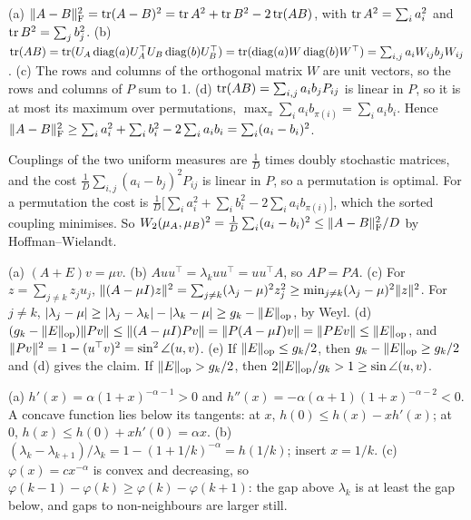 (a) $\lVert A-B\rVert_{\mathrm{F}}^2=\operatorname{tr}(A-B)^2=\operatorname{tr} A^2+\operatorname{tr} B^2-2\operatorname{tr}(AB)$, with $\operatorname{tr} A^2=\sum_ia_i^2$ and $\operatorname{tr} B^2=\sum_jb_j^2$.
\newline (b) $\operatorname{tr}(AB)=\operatorname{tr}(U_A\operatorname{diag}(a)U_A^\top U_B\operatorname{diag}(b)U_B^\top)=\operatorname{tr}(\operatorname{diag}(a)W\operatorname{diag}(b)W^\top)=\sum_{i,j}a_iW_{ij}b_jW_{ij}$.
\newline (c) The rows and columns of the orthogonal matrix $W$ are unit vectors, so the rows and columns of $P$ sum to 1.
\newline (d) $\operatorname{tr}(AB)=\sum_{i,j}a_ib_jP_{ij}$ is linear in $P$, so it is at most its maximum over permutations,
$\max_\pi\sum_ia_ib_{\pi(i)}=\sum_ia_ib_i$. Hence $\lVert A-B\rVert_{\mathrm{F}}^2\ge\sum_ia_i^2+\sum_ib_i^2-2\sum_ia_ib_i=\sum_i(a_i-b_i)^2$.

Couplings of the two uniform measures are $\frac1D$ times doubly stochastic matrices, and the cost
$\frac1D\sum_{i,j}(a_i-b_j)^2P_{ij}$ is linear in $P$, so a permutation is optimal. For a permutation the cost is
$\frac1D\bigl[\sum_ia_i^2+\sum_ib_i^2-2\sum_ia_ib_{\pi(i)}\bigr]$, which the sorted coupling minimises. So
$W_2(\mu_A,\mu_B)^2=\frac1D\sum_i(a_i-b_i)^2\le\lVert A-B\rVert_{\mathrm{F}}^2/D$ by Hoffman--Wielandt.

(a) $(A+E)v=\mu v$.
\newline (b) $Auu^\top=\lambda_kuu^\top=uu^\top A$, so $AP=PA$.
\newline (c) For $z=\sum_{j\ne k}z_ju_j$, $\lVert(A-\mu I)z\rVert^2=\sum_{j\ne k}(\lambda_j-\mu)^2z_j^2\ge\min_{j\ne k}(\lambda_j-\mu)^2\lVert z\rVert^2$.
For $j\ne k$, $\lvert\lambda_j-\mu\rvert\ge\lvert\lambda_j-\lambda_k\rvert-\lvert\lambda_k-\mu\rvert\ge g_k-\lVert E\rVert_{\mathrm{op}}$, by Weyl.
\newline (d) $(g_k-\lVert E\rVert_{\mathrm{op}})\lVert Pv\rVert\le\lVert(A-\mu I)Pv\rVert=\lVert P(A-\mu I)v\rVert=\lVert PEv\rVert\le\lVert E\rVert_{\mathrm{op}}$, and
$\lVert Pv\rVert^2=1-(u^\top v)^2=\sin^2\angle(u,v)$.
\newline (e) If $\lVert E\rVert_{\mathrm{op}}\le g_k/2$, then $g_k-\lVert E\rVert_{\mathrm{op}}\ge g_k/2$ and (d) gives the claim. If $\lVert E\rVert_{\mathrm{op}}>g_k/2$, then
$2\lVert E\rVert_{\mathrm{op}}/g_k>1\ge\sin\angle(u,v)$.

(a) $h'(x)=\alpha(1+x)^{-\alpha-1}>0$ and $h''(x)=-\alpha(\alpha+1)(1+x)^{-\alpha-2}<0$. A concave function lies below
its tangents: at $x$, $h(0)\le h(x)-xh'(x)$; at 0, $h(x)\le h(0)+xh'(0)=\alpha x$.
\newline (b) $(\lambda_k-\lambda_{k+1})/\lambda_k=1-(1+1/k)^{-\alpha}=h(1/k)$; insert $x=1/k$.
\newline (c) $\varphi(x)=cx^{-\alpha}$ is convex and decreasing, so $\varphi(k-1)-\varphi(k)\ge\varphi(k)-\varphi(k+1)$: the gap
above $\lambda_k$ is at least the gap below, and gaps to non-neighbours are larger still.

